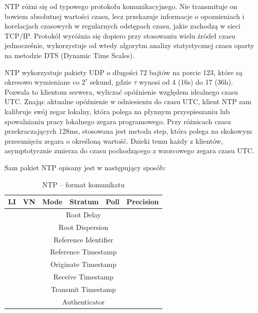 \documentclass[../main.tex]{subfiles}
\begin{document}
NTP różni się od typowego protokołu komunikacyjnego. 
Nie transmituje on bowiem absolutnej wartości czasu, lecz przekazuje informacje o opoznieniach i korelacjach czasowych w regularnych odstępach czasu, jakie zachodzą w sieci TCP/IP. 
Protokół wyróżnia się dopiero przy stosowaniu wielu źródeł czasu jednocześnie, wykorzystuje od wtedy algorytm analizy statystycznej czasu oparty na metodzie DTS (Dynamic Time Scales).

NTP wykorzystuje pakiety UDP o długości 72 bajtów na porcie 123, które są okresowo wymieniane co ${2^\tau}$ sekund, gdzie ${\tau}$ wynosi od 4 (16s) do 17 (36h). 
Pozwala to klientom serwera, wyliczać opóźnienie względem idealnego czasu UTC.
Znając aktualne opóźnienie w odniesieniu do czasu UTC, klient NTP sam kalibruje swój zegar lokalny, która polega na płynnym przyspieszaniu lub spowalnianiu pracy lokalnego zegara programowego.
Przy różnicach czasu przekraczających 128ms, stosowana jest metoda step, która polega na skokowym przesunięciu zegara o określoną wartość.
Dzieki temu każdy z klientów, asymptotycznie zmierza do czasu pochodzącego z wzorcowego zegara czasu UTC.

\newpage

Sam pakiet NTP opisany jest w następujący sposób:

\begin{table}[H]
  \centering
  \begin{tabular}{|c|c|c|c|c|c|}
    \hline
    LI & VN & Mode & Stratum & Poll & Precision \\
    \hline
    \multicolumn{6}{|c|}{Root Delay} \\
    \hline
    \multicolumn{6}{|c|}{Root Dispersion} \\
    \hline
    \multicolumn{6}{|c|}{Reference Identifier} \\
    \hline
    \multicolumn{6}{|c|}{Reference Timestamp} \\
    \hline
    \multicolumn{6}{|c|}{Originate Timestamp} \\
    \hline
    \multicolumn{6}{|c|}{Receive Timestamp} \\
    \hline
    \multicolumn{6}{|c|}{Transmit Timestamp} \\
    \hline
    \multicolumn{6}{|c|}{Authenticator} \\
    \hline
  \end{tabular}
  \caption{NTP – format komunikatu}

\end{table}
\end{document}
